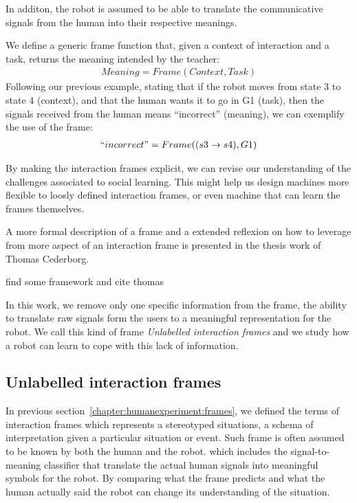 In additon, the robot is assumed to be able to translate the communicative signals from the human into their respective meanings.





We define a generic frame function that, given a context of interaction and a task, returns the meaning intended by the teacher:
%
\begin{eqnarray}
Meaning = Frame(Context, Task)
\end{eqnarray}
%
Following our previous example, stating that if the robot moves from state 3 to state 4 (context), and that the human wants it to go in G1 (task), then the signals received from the human means ``incorrect'' (meaning), we can exemplify the use of the frame:
%
\begin{eqnarray}
``incorrect" = Frame((s3 \rightarrow s4), G1)
\end{eqnarray}



By making the interaction frames explicit, we can revise our understanding of the challenges associated to social learning. This might help us design machines more flexible to loosly defined interaction frames, or even machine that can learn the frames themselves.

A more formal description of a frame and a extended reflexion on how to leverage from more aspect of an interaction frame is presented in the thesis work of Thomas Cederborg. 


find some framework and cite thomas \cite{cederborg2013language}



In this work, we remove only one specific information from the frame, the ability to translate raw signals form the users to a meaningful representation for the robot. We call this kind of frame \emph{Unlabelled interaction frames} and we study how a robot can learn to cope with this lack of information. 

\subsection{Unlabelled interaction frames}

In previous section~\ref{chapter:humanexperiment:frames}, we defined the terms of interaction frames which represents a stereotyped situations, a schema of interpretation given a particular situation or event. Such frame is often assumed to be known by both the human and the robot.  which includes the signal-to-meaning classifier that translate the actual human signals into meaningful symbols for the robot. By comparing what the frame predicts and what the human actually said the robot can change its understanding of the situation.

